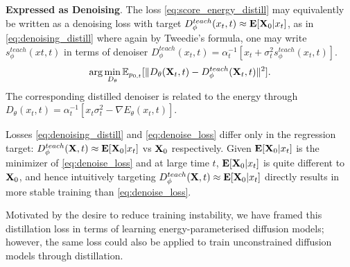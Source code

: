 \textbf{Expressed as Denoising}. The loss \eqref{eq:score_energy_distill} may equivalently be written as a denoising loss with target $D^{teach}_{\phi}(x_{t},t) \approx \mathbf{E}[\mathbf{X}_0|x_t]$, as in \eqref{eq:denoising_distill} where again by Tweedie's formula, one may write $s^{teach}_{\phi}(x{t},t)$ in terms of denoiser $D^{teach}_{\phi}(x_{t},t)=\alpha_t^{-1}[x_t+\sigma_t^2 s^{teach}_{\phi}(x_{t},t)]$. 
\begin{align} \label{eq:denoising_distill}
    \arg\min_{D_\theta} \mathbb{E}_{p_{0,t}}[\| D_\theta(\mathbf{X}_{t},t) - D^{teach}_{\phi}(\mathbf{X}_{t},t)\|^2].
\end{align}
The corresponding distilled denoiser is related to the energy through $D_\theta(x_t,t)= \alpha_t^{-1}[x_t\sigma_t^2 -\nabla E_{\theta}(x_{t},t)]$.

Losses \eqref{eq:denoising_distill} and \eqref{eq:denoise_loss} differ only in the regression target: $D^{teach}_{\phi}(\mathbf{X},t) \approx \mathbf{E}[\mathbf{X}_0|x_t]$ vs $\mathbf{X}_0$ respectively. Given $\mathbf{E}[\mathbf{X}_0|x_t]$ is the minimizer of \eqref{eq:denoise_loss} and at large time $t$, $\mathbf{E}[\mathbf{X}_0|x_t]$ is quite different to $\mathbf{X}_0$, and hence intuitively targeting $D^{teach}_{\phi}(\mathbf{X},t) \approx \mathbf{E}[\mathbf{X}_0|x_t]$ directly results in more stable training than \eqref{eq:denoise_loss}.

 Motivated by the desire to reduce training instability, we have framed this distillation loss in terms of learning energy-parameterised diffusion models; however, the same loss could also be applied to train unconstrained diffusion models through distillation.


